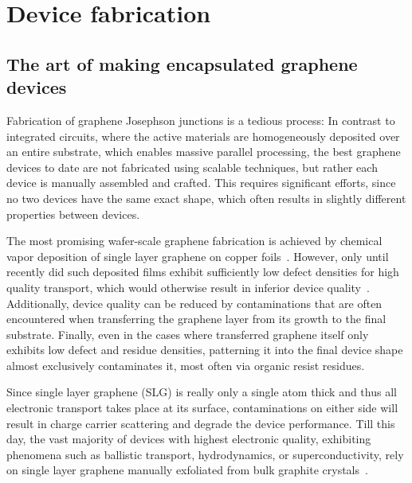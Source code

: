 \section{Device fabrication}
\label{sec:fabrication}



\subsection{The art of making encapsulated graphene devices}

Fabrication of graphene Josephson junctions is a tedious process:
% 
In contrast to integrated circuits, where the active materials are homogeneously deposited over an entire substrate, which enables massive parallel processing, the best graphene devices to date are not fabricated using scalable techniques, but rather each device is manually assembled and crafted.
%
This requires significant efforts, since no two devices have the same exact shape, which often results in slightly different properties between devices.


The most promising wafer-scale graphene fabrication is achieved by chemical vapor deposition of single layer graphene on copper foils~\cite{zhangReviewChemicalVapor2013,linBridgingGapReality2018}.
% 
However, only until recently did such deposited films exhibit sufficiently low defect densities for high quality transport, which would otherwise result in inferior device quality~\cite{banszerusBallisticTransportExceeding2016a,neumaierIntegratingGrapheneSemiconductor2019}.
% 
Additionally, device quality can be reduced by contaminations that are often encountered when transferring the graphene layer from its growth to the final substrate.
% 
Finally, even in the cases where transferred graphene itself only exhibits low defect and residue densities, patterning it into the final device shape almost exclusively contaminates it, most often via organic resist residues.

Since single layer graphene (SLG) is really only a single atom thick and thus all electronic transport takes place at its surface, contaminations on either side will result in charge carrier scattering and degrade the device performance.
% 
Till this day, the vast majority of devices with highest electronic quality, exhibiting phenomena such as ballistic transport, hydrodynamics, or superconductivity, rely on single layer graphene manually exfoliated from bulk graphite crystals~\cite{mayorovMicrometerScaleBallisticTransport2011b,bandurinNegativeLocalResistance2016a,caoCorrelatedInsulatorBehaviour2018,caoUnconventionalSuperconductivityMagicangle2018a}.


